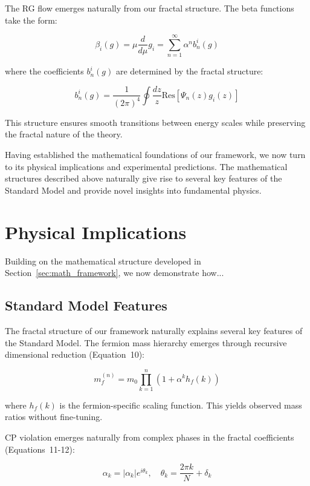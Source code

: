 \documentclass{article}
\begin{document}
The RG flow emerges naturally from our fractal structure. The beta functions take the form:

\[
\beta_i(g) = \mu\frac{d}{d\mu}g_i = \sum_{n=1}^{\infty} \alpha^n b_n^i(g)
\]

where the coefficients $b_n^i(g)$ are determined by the fractal structure:

\[
b_n^i(g) = \frac{1}{(2\pi)^4}\oint \frac{dz}{z} \text{Res}\left[\Psi_n(z)g_i(z)\right]
\]

This structure ensures smooth transitions between energy scales while preserving the fractal nature of the theory.

Having established the mathematical foundations of our framework, we now turn to its physical implications and experimental predictions. The mathematical structures described above naturally give rise to several key features of the Standard Model and provide novel insights into fundamental physics.

\section{Physical Implications}

\label{sec:physical_implications}

Building on the mathematical structure developed in Section~\ref{sec:math_framework}, we now demonstrate how...

\subsection{Standard Model Features}

The fractal structure of our framework naturally explains several key features of the Standard Model. The fermion mass hierarchy emerges through recursive dimensional reduction (Equation~10):

\begin{equation}
m_f^{(n)} = m_0 \prod_{k=1}^n \left(1 + \alpha^k h_f(k)\right)
\end{equation}

where $h_f(k)$ is the fermion-specific scaling function. This yields observed mass ratios without fine-tuning.

CP violation emerges naturally from complex phases in the fractal coefficients (Equations~11-12):

\begin{equation}
\alpha_k = |\alpha_k|e^{i\theta_k}, \quad \theta_k = \frac{2\pi k}{N} + \delta_k
\end{equation}
\end{document}
